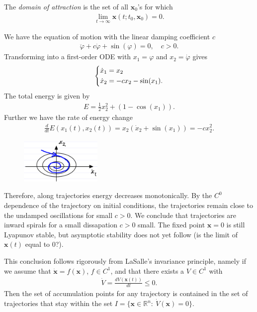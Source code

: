 \begin{definition} 
	The \emph{domain of attraction} is the set of all $ \bm{x}_0$'s for which
	\begin{align}
		\boxed{\lim_{t\to \infty } \bm{x}(t;t_0,  \bm{x}_0)=0. }	
	\end{align}
	
\end{definition}

\begin{ex}
	We have the equation of motion with the linear damping coefficient $c$
	\begin{align}
		\ddot{\varphi} + c \dot{\varphi} + \sin(\varphi) = 0,\quad c>0.
	\end{align}
	Transforming into a first-order ODE with $x_1 = \varphi$ and $x_2 = \dot{\varphi}$ gives
	 \begin{align}
		\begin{dcases}
		\dot{x}_1 = x_2\\ \dot{x}_2 = -cx_2 - \sin(x_1).
		\end{dcases}
	\end{align}
The total energy is given by
\begin{align}
	E = \frac{1}{2}x_2^2 + \left( 1 - \cos(x_1) \right). 
\end{align}
Further we have the rate of energy change
\begin{align}
\frac{d}{dt} E(x_1(t), x_2(t)) = x_2 \left(\dot{x}_2 + \sin(x_1) \right) = -c x_2^{2}.
\end{align}
\begin{figure}[h!]
	\centering
	\includegraphics[width=0.35\textwidth]{figures/ch2/4damped_pendulum.png}
\end{figure}

Therefore, along trajectories energy decreases monotonically. By the $C^0$ dependence of the trajectory on initial conditions, the trajectories remain close to the undamped oscillations for small $c>0$. We conclude that trajectories are inward spirals for a small dissapation $c>0$ small. The fixed point $ \bm{x}=0$ is still Lyapunov stable, but asymptotic stability does not yet follow (is the limit of $ \bm{x}(t)$ equal to 0?).
\begin{remark}
	This conclusion follows rigorously from LaSalle's invariance principle, namely if we assume that $\dot{ \bm{x}}=f( \bm{x})$, $f \in C^1$, and that there exists a $V\in C^1$ with 
	\begin{align}
		\dot{V} = \frac{dV( \bm{x}(t))}{dt} \leq 0.	
	\end{align}
	Then the set of accumulation points for any trajectory is contained in the set of trajectories that stay within the set $I=\{ \bm{x} \in \mathbb{R}^{n}:\ \dot{V}( \bm{x}) = 0\}$.
\end{remark}
\end{ex}

